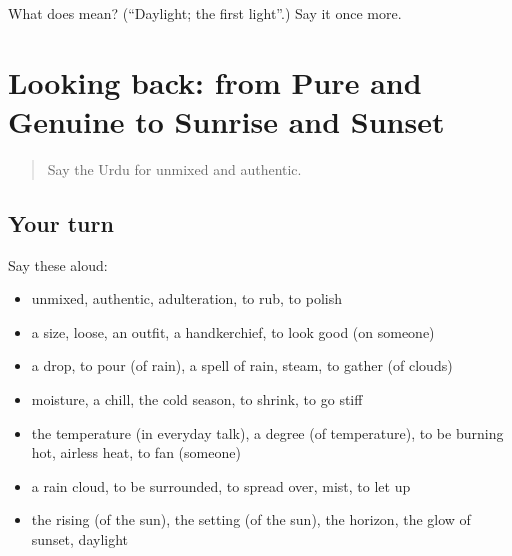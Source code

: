 \begin{tcolorbox}[breakable,colback=teal!4,colframe=teal!35!black,title={Before you move on}]
What does  mean? (\textquotedblleft{}Daylight; the first light\textquotedblright{}.) Say it once more.
\end{tcolorbox}
\section[(dialogue)]{Looking back: from Pure and Genuine to Sunrise and Sunset}

\label{lesson:UR-R432-review-426-432}



\begin{quote}
Say the Urdu for unmixed and authentic.
\end{quote}

\subsection*{Your turn}
Say these aloud:

\begin{itemize}
\raggedright
  \item unmixed, authentic, adulteration, to rub, to polish
  \item a size, loose, an outfit, a handkerchief, to look good (on someone)
  \item a drop, to pour (of rain), a spell of rain, steam, to gather (of clouds)
  \item moisture, a chill, the cold season, to shrink, to go stiff
  \item the temperature (in everyday talk), a degree (of temperature), to be burning hot, airless heat, to fan (someone)
  \item a rain cloud, to be surrounded, to spread over, mist, to let up
  \item the rising (of the sun), the setting (of the sun), the horizon, the glow of sunset, daylight
\end{itemize}

